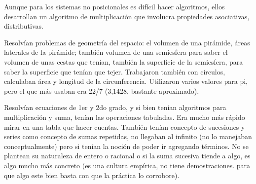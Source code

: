 Aunque para los sistemas no posicionales es difícil hacer algoritmos, ellos desarrollan un algoritmo de multiplicación que involucra propiedades asociativas, distributivas. 

Resolvían problemas de geometría del espacio: el volumen de una pirámide, áreas laterales de la pirámide; también volumen de una semiesfera para saber el volumen de unas cestas que tenían, también la superficie de la semiesfera, para saber la superficie que tenían que tejer. Trabajaron también con círculos, calculaban área y longitud de la circunferencia. Utilizaron varios valores para pi, pero el que más usaban era 22/7 (3,1428, bastante aproximado). 

Resolvían ecuaciones de 1er y 2do grado, y si bien tenían algoritmos para multiplicación y suma, tenían las operaciones tabuladas. Era mucho más rápido mirar en una tabla que hacer cuentas. También tenían concepto de sucesiones y series como concepto de sumas repetidas, no llegaban al infinito (no lo manejaban conceptualmente) pero si tenían la noción de poder ir agregando términos. No se plantean su naturaleza de entero o racional o si la suma sucesiva tiende a algo, es algo mucho más concreto (es una cultura empírica, no tiene demostraciones. para que algo este bien basta con que la práctica lo corrobore).







